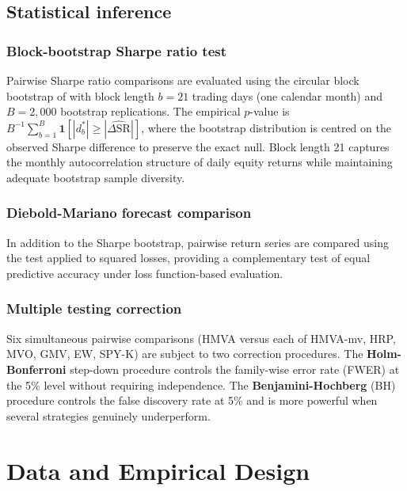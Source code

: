 \documentclass[a4paper,12pt]{report}
\begin{document}
\section{Statistical inference}
\label{sec:meth-inference}

\subsection{Block-bootstrap Sharpe ratio test}

Pairwise Sharpe ratio comparisons are evaluated using the circular block
bootstrap of \citet{ledoitwolf2008} with block length $b = 21$ trading days
(one calendar month) and $B = 2{,}000$ bootstrap replications. The empirical
$p$-value is $B^{-1}\sum_{b=1}^{B}\mathbf{1}[|d_b^*| \geq |\widehat{\Delta\mathrm{SR}}|]$,
where the bootstrap distribution is centred on the observed Sharpe difference
to preserve the exact null. Block length 21 captures the monthly
autocorrelation structure of daily equity returns while maintaining adequate
bootstrap sample diversity.

\subsection{Diebold-Mariano forecast comparison}

In addition to the Sharpe bootstrap, pairwise return series are compared
using the \citet{dieboldmariano1995} test applied to squared losses,
providing a complementary test of equal predictive accuracy under loss
function-based evaluation.

\subsection{Multiple testing correction}

Six simultaneous pairwise comparisons (HMVA versus each of HMVA-mv, HRP,
MVO, GMV, EW, SPY-K) are subject to two correction procedures.
The \textbf{Holm-Bonferroni} step-down procedure \citep{holm1979} controls
the family-wise error rate (FWER) at the 5\% level without requiring
independence. The \textbf{Benjamini-Hochberg} (BH) procedure
\citep{benjaminihochberg1995} controls the false discovery rate at 5\% and
is more powerful when several strategies genuinely underperform.

\chapter{Data and Empirical Design}
\label{ch:data}
\end{document}

